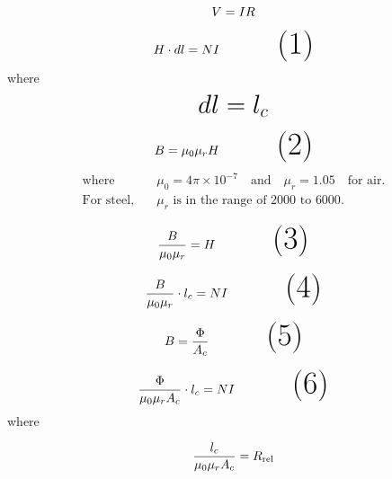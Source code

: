 \documentclass{article}
\begin{document}
\begin{equation}
\Huge {V} = {I}{R}
\end{equation}

\begin{equation}
   \Huge  {H} \cdot d{l} = NI \tag{1}
\end{equation}
\Large where
\vspace{0.5cm} %
\[
   \text{\huge $dl = l_c$}
\]


\vspace{0.5cm} %
\begin{equation}
    \Huge {B} = \mu_0 \mu_r {H}\tag{2}
\end{equation}
\begin{align*}
\text{where} \quad & \mu_0 = 4 \pi \times 10^{-7} \quad \text{and} \quad \mu_r = 1.05 \quad \text{for air}. \\
\text{For steel,} \quad & \mu_r \text{ is in the range of } 2000 \text{ to } 6000.
\end{align*}



\vspace{0.5cm} %
\begin{equation}
   \Huge  \frac{B}{\mu_0 \mu_r} = {H}\tag{3}
\end{equation}

\vspace{0.5cm} %
\begin{equation}
   \Huge  \frac{B}{\mu_0 \mu_r} \cdot {l_c}= NI \tag{4}
\end{equation}


\vspace{0.5cm} %
\begin{equation}
   \Huge  {B} =\frac {\Phi}{A_c}\tag{5}
\end{equation}

\vspace{0.5cm} %
\begin{equation}
   \Huge  \frac{\Phi}{\mu_0 \mu_rA_c} \cdot {l_c}= NI \tag{6}
\end{equation}\vspace{0.5cm} %
where

\begin{tcolorbox}[colframe=black, boxrule=1mm, sharp corners=south] %
\[
   \Huge \frac{l_c}{\mu_0 \mu_r A_c} = R_\text{rel}
\]
\end{tcolorbox}
\end{document}
